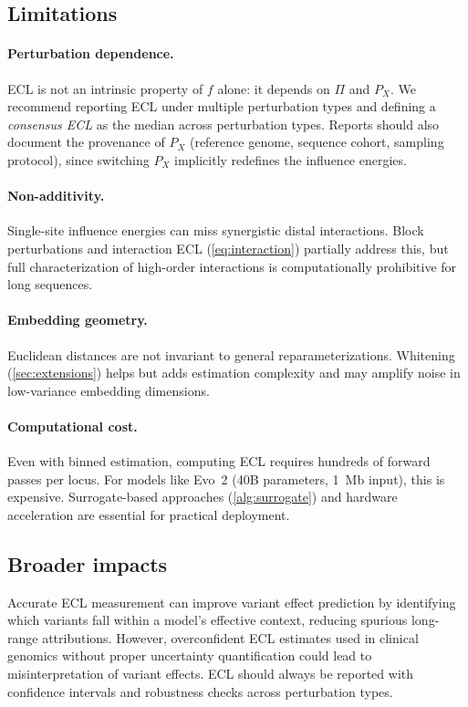 \subsection{Limitations}

\paragraph{Perturbation dependence.}
ECL is not an intrinsic property of $f$ alone: it depends on $\Pi$ and $P_X$. We recommend reporting ECL under multiple perturbation types and defining a \emph{consensus ECL} as the median across perturbation types. Reports should also document the provenance of $P_X$ (reference genome, sequence cohort, sampling protocol), since switching $P_X$ implicitly redefines the influence energies.

\paragraph{Non-additivity.}
Single-site influence energies can miss synergistic distal interactions. Block perturbations and interaction ECL (\cref{eq:interaction}) partially address this, but full characterization of high-order interactions is computationally prohibitive for long sequences.

\paragraph{Embedding geometry.}
Euclidean distances are not invariant to general reparameterizations. Whitening (\cref{sec:extensions}) helps but adds estimation complexity and may amplify noise in low-variance embedding dimensions.

\paragraph{Computational cost.}
Even with binned estimation, computing ECL requires hundreds of forward passes per locus. For models like Evo~2 (40B parameters, 1~Mb input), this is expensive. Surrogate-based approaches (\cref{alg:surrogate}) and hardware acceleration are essential for practical deployment.

\subsection{Broader impacts}

Accurate ECL measurement can improve variant effect prediction by identifying which variants fall within a model's effective context, reducing spurious long-range attributions. However, overconfident ECL estimates used in clinical genomics without proper uncertainty quantification could lead to misinterpretation of variant effects. ECL should always be reported with confidence intervals and robustness checks across perturbation types.
